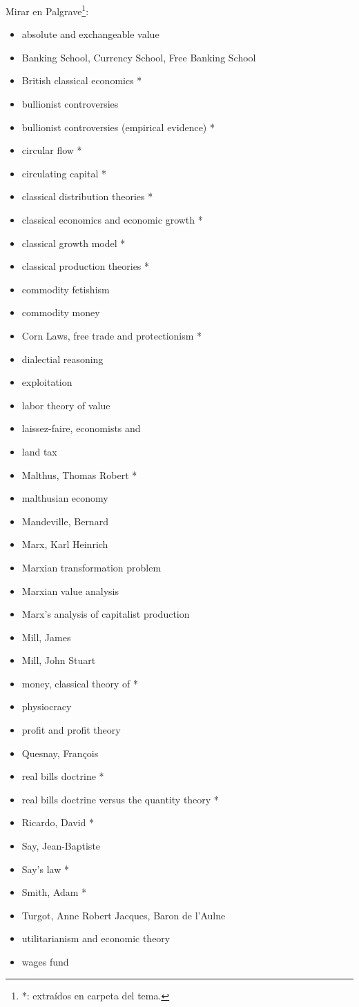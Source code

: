 \documentclass{nuevotema}
\begin{document}
Mirar en Palgrave\footnote{*: extraídos en carpeta del tema.}:
\begin{itemize}
	\item absolute and exchangeable value
	\item Banking School, Currency School, Free Banking School
	\item British classical economics *
	\item bullionist controversies
	\item bullionist controversies (empirical evidence) *
	\item circular flow *
	\item circulating capital *
	\item classical distribution theories *
	\item classical economics and economic growth *
	\item classical growth model *
	\item classical production theories *
	\item commodity fetishism
	\item commodity money
	\item Corn Laws, free trade and protectionism *
	\item dialectial reasoning
	\item exploitation
	\item labor theory of value
	\item laissez-faire, economists and
	\item land tax
	\item Malthus, Thomas Robert *
	\item malthusian economy
	\item Mandeville, Bernard
	\item Marx, Karl Heinrich
	\item Marxian transformation problem
	\item Marxian value analysis
	\item Marx's analysis of capitalist production
	\item Mill, James
	\item Mill, John Stuart
	\item money, classical theory of *
	\item physiocracy
	\item profit and profit theory
	\item Quesnay, François
	\item real bills doctrine *
	\item real bills doctrine versus the quantity theory *
	\item Ricardo, David *
	\item Say, Jean-Baptiste
	\item Say's law *
	\item Smith, Adam *
	\item Turgot, Anne Robert Jacques, Baron de l'Aulne
	\item utilitarianism and economic theory
	\item wages fund
\end{itemize}
\end{document}
